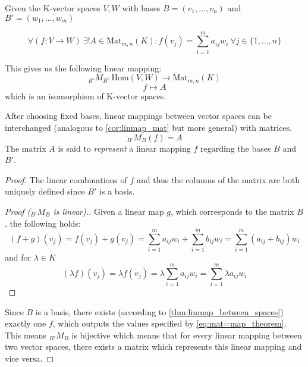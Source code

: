 \begin{theorem}[Linear Maps = Matrices]\label{thm:linmap=mat}
   Given the K-vector spaces \(V, W\) with bases \(B = (v_1, \ldots, v_n)\) and \(B' = (w_1, \ldots, w_m)\)

   \begin{equation} \label{eq:mat=map_theorem}
      \forall (f: V \to W)~\exists! A \in \text{Mat}_{m,n}(K): f(v_j) = \sum_{i=1}^m a_{ij} w_i~\forall j \in \{1, \ldots, n\}
   \end{equation}

   This gives us the following linear mapping:
   \[{}_{B'}M_{B}: \text{Hom}(V, W) \to \text{Mat}_{m,n}(K)\]
   \[f \mapsto A\]
   which is an isomorphism of K-vector spaces.
\end{theorem}
\begin{remark}
   After choosing fixed bases, linear mappings between vector spaces can be interchanged (analogous to \cref{cor:linmap_mat} but more general) with matrices.
   \[{}_{B'}M_{B}(f) = A\]
The matrix \(A\) is said to \textit{represent} a linear mapping \(f\) regarding the bases \(B\) and \(B'\).
\end{remark}
\begin{proof}
   The linear combinations of \(f\) and thus the columns of the matrix are both uniquely defined since \(B'\) is a basis.

   \begin{proof}[Proof (\({}_{B'}M_{B}\) is linear).]
      Given a linear map \(g\), which corresponds to the matrix \(B\), the following holds:
      \[(f + g)(v_j) = f(v_j) + g(v_j) = \sum_{i=1}^m a_{ij} w_i + \sum_{i=1}^m b_{ij} w_i = \sum_{i=1}^m (a_{ij} + b_{ij}) w_i\]
      and for \(\lambda \in K\)
      \[(\lambda f)(v_j) = \lambda f(v_j) = \lambda \sum_{i=1}^m a_{ij} w_i = \sum_{i=1}^m \lambda a_{ij} w_i\]
   \end{proof}

   Since \(B\) is a basis, there exists (according to \cref{thm:linmap_between_spaces}) exactly one \(f\), which outputs the values specified by \cref{eq:mat=map_theorem}.
   This means \({}_{B'}M_{B}\) is bijective which means that for every linear mapping between two vector spaces, there exists a matrix which represents this linear mapping and vice versa.
\end{proof}

